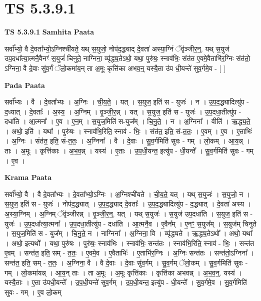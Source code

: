 \documentclass[17pt]{extarticle}
\begin{document}
\section{ TS 5.3.9.1 }

\textbf{TS 5.3.9.1 } \newline
\textbf{Samhita Paata} \newline

सर्वा᳚भ्यो॒ वै दे॒वता᳚भ्यो॒ऽग्निश्ची॑यते॒ यथ् स॒युजो॒ नोप॑द॒द्ध्याद् दे॒वता॑ अस्या॒ग्निं ॅवृ॑ञ्जीर॒न्॒. यथ् स॒युज॑ उप॒दधा᳚त्या॒त्मनै॒वैनꣳ॑ स॒युजं॑ चिनुते॒ नाग्निना॒ व्यृ॑द्ध्य॒तेऽथो॒ यथा॒ पुरु॑षः॒ स्नाव॑भिः॒ संत॑त ए॒वमे॒वैताभि॑र॒ग्निः संत॑तो॒ ऽग्निना॒ वै दे॒वाः सु॑व॒र्गं ॅलो॒कमा॑य॒न् ता अ॒मूः कृत्ति॑का अभव॒न्॒ यस्यै॒ता उ॑प धी॒यन्ते॑ सुव॒र्गमे॒व - [  ] \newline

\textbf{Pada Paata} \newline

सर्वा᳚भ्यः । वै । दे॒वता᳚भ्यः । अ॒ग्निः । ची॒य॒ते॒ । यत् । स॒युज॒ इति॑ स - युजः॑ । न । उ॒प॒द॒द्ध्यादित्यु॑प - द॒ध्यात् । दे॒वताः᳚ । अ॒स्य॒ । अ॒ग्निम् । वृ॒ञ्जी॒र॒न्न् । यत् । स॒युज॒ इति॑ स - युजः॑ । उ॒प॒दधा॒तीत्यु॑प - दधा॑ति । आ॒त्मना᳚ । ए॒व । ए॒न॒म् । स॒युज॒मिति॑ स-युज᳚म् । चि॒नु॒ते॒ । न । अ॒ग्निना᳚ । वीति॑ । ऋ॒द्ध्य॒ते॒ । अथो॒ इति॑ । यथा᳚ । पुरु॑षः । स्नाव॑भि॒रिति॒ स्नाव॑ - भिः॒ । संत॑त॒ इति॒ सं-त॒तः॒ । ए॒वम् । ए॒व । ए॒ताभिः॑ । अ॒ग्निः । संत॑त॒ इति॒ सं-त॒तः॒ । अ॒ग्निना᳚ । वै । दे॒वाः । सु॒व॒र्गमिति॑ सुवः - गम् । लो॒कम् । आ॒य॒न्न् । ताः । अ॒मूः । कृत्ति॑काः । अ॒भ॒व॒न्न् । यस्य॑ । ए॒ताः । उ॒प॒धी॒यन्त॒ इत्यु॑प - धी॒यन्ते᳚ । सु॒व॒र्गमिति॑ सुवः - गम् । ए॒व ।  \newline


\textbf{Krama Paata} \newline

सर्वा᳚भ्यो॒ वै । वै दे॒वता᳚भ्यः । दे॒वता᳚भ्यो॒ऽग्निः । अ॒ग्निश्ची॑यते । ची॒य॒ते॒ यत् । यथ् स॒युजः॑ । स॒युजो॒ न । स॒युज॒ इति॑ स - युजः॑ । नोप॑द॒द्ध्यात् । उ॒प॒द॒द्ध्याद् दे॒वताः᳚ । उ॒प॒द॒द्ध्यादित्यु॑प - द॒द्ध्यात् । दे॒वता॑ अस्य । अ॒स्या॒ग्निम् । अ॒ग्निम् ॅवृ॑ञ्जीरन्न् । वृ॒ञ्जी॒र॒न्॒. यत् । यथ् स॒युजः॑ । स॒युज॑ उप॒दधा॑ति । स॒युज॒ इति॑ स - युजः॑ । उ॒प॒दधा᳚त्या॒त्मना᳚ । उ॒प॒दधा॒तीत्यु॑प - दधा॑ति । आ॒त्मनै॒व । ए॒वैन᳚म् । ए॒नꣳ॒॒ स॒युज᳚म् । स॒युज॑म् चिनुते । स॒युज॒मिति॑ स - युज᳚म् । चि॒नु॒ते॒ न । नाग्निना᳚ । अ॒ग्निना॒ वि । व्यृ॑द्ध्यते । ऋ॒द्ध्य॒तेऽथो᳚ । अथो॒ यथा᳚ । अथो॒ इत्यथो᳚ । यथा॒ पुरु॑षः । पुरु॑षः॒ स्नाव॑भिः । स्नाव॑भिः॒ सन्त॑तः । स्नाव॑भि॒रिति॒ स्नाव॑ - भिः॒ । सन्त॑त ए॒वम् । सन्त॑त॒ इति॒ सम् - त॒तः॒ । ए॒वमे॒व । ए॒वैताभिः॑ । ए॒ताभि॑र॒ग्निः । अ॒ग्निः सन्त॑तः । सन्त॑तो॒ऽग्निना᳚ । सन्त॑त॒ इति॒ सम् - त॒तः॒ । अ॒ग्निना॒ वै । वै दे॒वाः । दे॒वाः सु॑व॒र्गम् । सु॒व॒र्गम् ॅलो॒कम् । सु॒व॒र्गमिति॑ सुवः - गम् । लो॒कमा॑यन्न् । आ॒य॒न् ताः । ता अ॒मूः । अ॒मूः कृत्ति॑काः । कृत्ति॑का अभवन्न् । अ॒भ॒व॒न्॒. यस्य॑ । यस्यै॒ताः । ए॒ता उ॑पधी॒यन्ते᳚ । उ॒प॒धी॒यन्ते॑ सुव॒र्गम् । उ॒प॒धी॒यन्त॒ इत्यु॑प - धी॒यन्ते᳚ । सु॒व॒र्गमे॒व । सु॒व॒र्गमिति॑ सुवः - गम् । ए॒व लो॒कम् \newline
\end{document}
